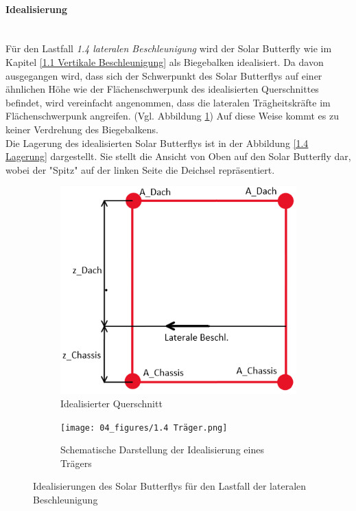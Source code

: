   \paragraph{Idealisierung}\mbox{}\\
  Für den Lastfall \emph{1.4 lateralen Beschleunigung} wird der Solar Butterfly wie im Kapitel \ref{1.1 Vertikale Beschleunigung} als Biegebalken idealisiert. Da davon ausgegangen wird, dass sich der Schwerpunkt des Solar Butterflys auf einer ähnlichen Höhe wie der Flächenschwerpunk des idealisierten Querschnittes befindet, wird vereinfacht angenommen, dass die lateralen Trägheitskräfte im Flächenschwerpunk angreifen. (Vgl. Abbildung \ref{1.4 Idealisierter Querschnitt}) Auf diese Weise kommt es zu keiner Verdrehung des Biegebalkens.\\
  Die Lagerung des idealisierten Solar Butterflys ist in der Abbildung \ref{1.4 Lagerung} dargestellt. Sie stellt die Ansicht von Oben auf den Solar Butterfly dar, wobei der "Spitz" auf der linken Seite die Deichsel repräsentiert.

  \begin{figure}[!ht]
    \centering
      \begin{subfigure}{.5\textwidth}
        \centering
        \includegraphics[width=0.75\linewidth]{04_figures/1.4 Querschnitt.png}
        \caption{Idealisierter Querschnitt}
        \label{1.4 Idealisierter Querschnitt}
      \end{subfigure}%
      \begin{subfigure}{.5\textwidth}
        \centering
        \texttt{[image: 04\_figures/1.4 Träger.png]}
        \caption{Schematische Darstellung der Idealisierung eines Trägers}
        \label{1.4 Träger}
      \end{subfigure}%
    \caption{Idealisierungen des Solar Butterflys für den Lastfall der lateralen Beschleunigung}
  \label{1.4 Idealisierung}
  \end{figure}


